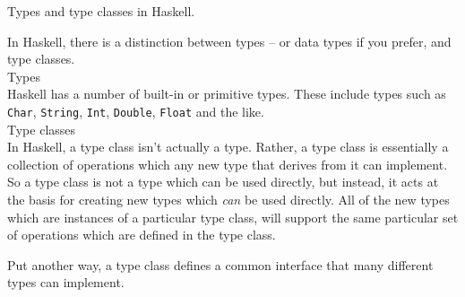 \begin{frame}[t, fragile]{Types and type classes in Haskell.}

In Haskell, there is a distinction between types -- or data types if you prefer, and type classes. \\

\textbullet{} Types \\

Haskell has a number of built-in or primitive types. These include types
such as \texttt{Char},
\texttt{String},
\texttt{Int}, \texttt{Double},
\texttt{Float} and the like. \\

\textbullet{} Type classes \\

In Haskell, a type class isn't actually a type. Rather, a type class is essentially a collection of operations which any new type that derives from it can implement. So a type class is not a type which can be used directly, but instead, it acts at the basis for creating new types which \textit{can} be used directly. All of the new types which are instances of a particular type class, will support the same particular set of operations which are defined in the type class.

Put another way, a type class defines a common interface that many different types can implement.

\end{frame}